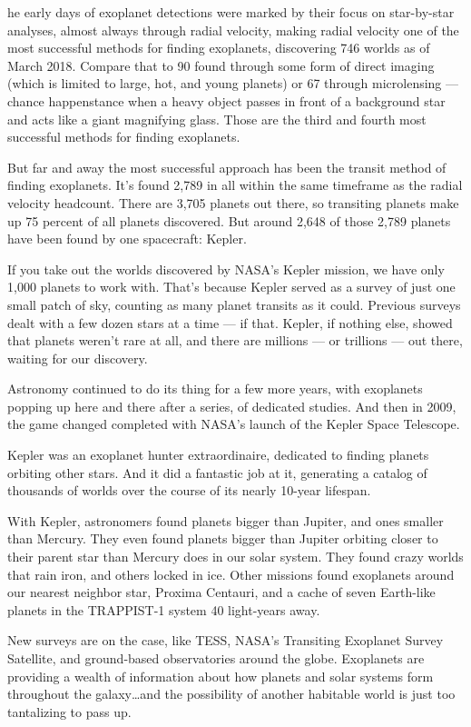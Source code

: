 he early days of exoplanet detections were marked by their focus on star-by-star analyses, almost always through radial velocity, making radial velocity one of the most successful methods for finding exoplanets, discovering 746 worlds as of March 2018. Compare that to 90 found through some form of direct imaging (which is limited to large, hot, and young planets) or 67 through microlensing — chance happenstance when a heavy object passes in front of a background star and acts like a giant magnifying glass. Those are the third and fourth most successful methods for finding exoplanets.

But far and away the most successful approach has been the transit method of finding exoplanets. It’s found 2,789 in all within the same timeframe as the radial velocity headcount. There are 3,705 planets out there, so transiting planets make up 75 percent of all planets discovered. But around 2,648 of those 2,789 planets have been found by one spacecraft: Kepler.

If you take out the worlds discovered by NASA’s Kepler mission, we have only 1,000 planets to work with. That’s because Kepler served as a survey of just one small patch of sky, counting as many planet transits as it could. Previous surveys dealt with a few dozen stars at a time — if that. Kepler, if nothing else, showed that planets weren’t rare at all, and there are millions — or trillions — out there, waiting for our discovery.

Astronomy continued to do its thing for a few more years, with exoplanets popping up here and there after a series, of dedicated studies. And then in 2009, the game changed completed with NASA’s launch of the Kepler Space Telescope.

Kepler was an exoplanet hunter extraordinaire, dedicated to finding planets orbiting other stars. And it did a fantastic job at it, generating a catalog of thousands of worlds over the course of its nearly 10-year lifespan.

With Kepler, astronomers found planets bigger than Jupiter, and ones smaller than Mercury. They even found planets bigger than Jupiter orbiting closer to their parent star than Mercury does in our solar system. They found crazy worlds that rain iron, and others locked in ice. Other missions found exoplanets around our nearest neighbor star, Proxima Centauri, and a cache of seven Earth-like planets in the TRAPPIST-1 system 40 light-years away.

New surveys are on the case, like TESS, NASA’s Transiting Exoplanet Survey Satellite, and ground-based observatories around the globe. Exoplanets are providing a wealth of information about how planets and solar systems form throughout the galaxy…and the possibility of another habitable world is just too tantalizing to pass up.

